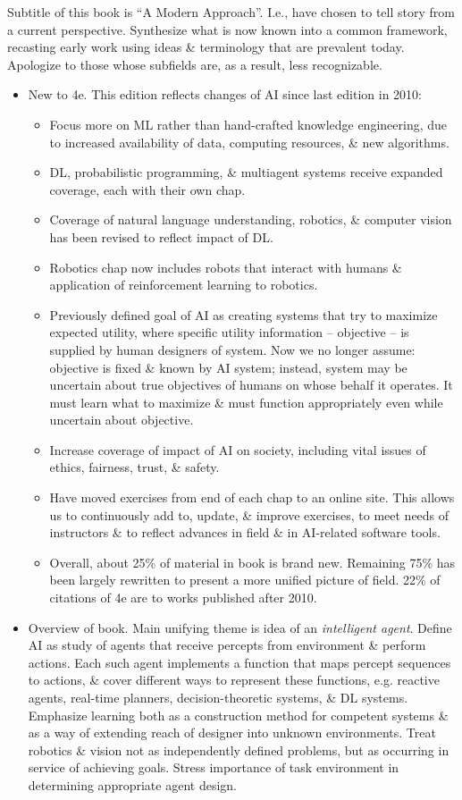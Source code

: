 \documentclass{article}
\begin{document}
\begin{itemize}
	Subtitle of this book is ``A Modern Approach''. I.e., have chosen to tell story from a current perspective. Synthesize what is now known into a common framework, recasting early work using ideas \& terminology that are prevalent today. Apologize to those whose subfields are, as a result, less recognizable.
	\begin{itemize}
		\item {\sf New to 4e.} This edition reflects changes of AI since last edition in 2010:
		\begin{itemize}
			\item Focus more on ML rather than hand-crafted knowledge engineering, due to increased availability of data, computing resources, \& new algorithms.
			\item DL, probabilistic programming, \& multiagent systems receive expanded coverage, each with their own chap.
			\item Coverage of natural language understanding, robotics, \& computer vision has been revised to reflect impact of DL.
			\item Robotics chap now includes robots that interact with humans \& application of reinforcement learning to robotics.
			\item Previously defined goal of AI as creating systems that try to maximize expected utility, where specific utility information -- objective -- is supplied by human designers of system. Now we no longer assume: objective is fixed \& known by AI system; instead, system may be uncertain about true objectives of humans on whose behalf it operates. It must learn what to maximize \& must function appropriately even while uncertain about objective.
			\item Increase coverage of impact of AI on society, including vital issues of ethics, fairness, trust, \& safety.
			\item Have moved exercises from end of each chap to an online site. This allows us to continuously add to, update, \& improve exercises, to meet needs of instructors \& to reflect advances in field \& in AI-related software tools.
			\item Overall, about 25\% of material in book is brand new. Remaining 75\% has been largely rewritten to present a more unified picture of field. 22\% of citations of 4e are to works published after 2010.
		\end{itemize}
		\item {\sf Overview of book.} Main unifying theme is idea of an {\it intelligent agent}. Define AI as study of agents that receive percepts from environment \& perform actions. Each such agent implements a function that maps percept sequences to actions, \& cover different ways to represent these functions, e.g. reactive agents, real-time planners, decision-theoretic systems, \& DL systems. Emphasize learning both as a construction method for competent systems \& as a way of extending reach of designer into unknown environments. Treat robotics \& vision not as independently defined problems, but as occurring in service of achieving goals. Stress importance of task environment in determining appropriate agent design.


\end{itemize}
\end{itemize}
\end{document}
